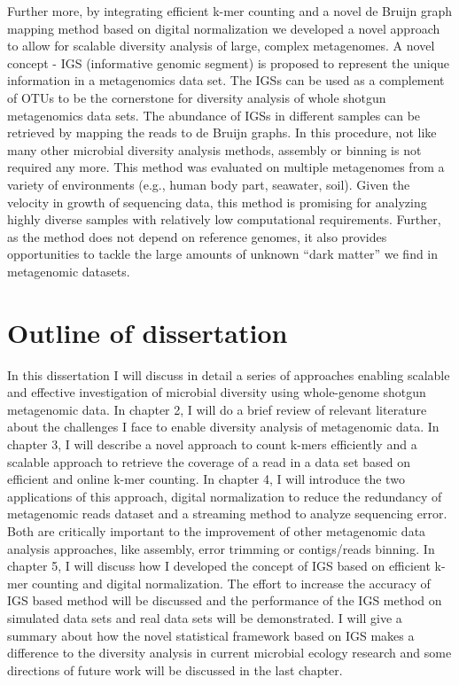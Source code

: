 Further more, by integrating efficient k-mer counting and a novel de Bruijn
graph mapping method based on digital normalization we developed a novel
approach to allow for scalable diversity analysis of large, complex
metagenomes. A novel concept - IGS (informative genomic segment) is proposed
to represent the unique information in a metagenomics data set. The IGSs can be
used as a complement of OTUs to be the cornerstone for diversity analysis of
whole shotgun metagenomics data sets. The abundance of IGSs in different
samples can be retrieved by mapping the reads to de Bruijn graphs. In this
procedure, not like many other microbial diversity analysis methods, assembly or
binning is not required any more. This method was evaluated on multiple
metagenomes from a variety of environments (e.g., human body part, seawater,
soil). Given the velocity in growth of sequencing data, this method is
promising for analyzing highly diverse samples with relatively low
computational requirements. Further, as the method does not depend on reference
genomes, it also provides opportunities to tackle the large amounts of unknown
``dark matter'' we find in metagenomic datasets.


\section{Outline of dissertation}

In this dissertation I will discuss in detail a series of approaches enabling
scalable and effective investigation of microbial diversity using whole-genome
shotgun metagenomic data. In chapter 2, I will do a brief review of relevant
literature about the challenges I face to enable diversity analysis of
metagenomic data. In chapter 3, I will describe a novel approach to count
k-mers efficiently and a scalable approach to retrieve the coverage of a read
in a data set based on efficient and online k-mer counting. In chapter 4, I
will introduce the two applications of this approach, digital normalization to
reduce the redundancy of metagenomic reads dataset and a streaming method to
analyze sequencing error. Both are critically important to the improvement of
other metagenomic data analysis approaches, like assembly, error trimming or
contigs/reads binning. In chapter 5, I will discuss how I developed the concept
of IGS based on efficient k-mer counting and digital normalization. The effort
to increase the accuracy of IGS based method will be discussed and the
performance of the IGS method on simulated data sets and real data sets will be
demonstrated. I will give a summary about how the novel statistical framework
based on IGS makes a difference to the diversity analysis in current microbial
ecology research and some directions of future work will be discussed in the
last chapter.


